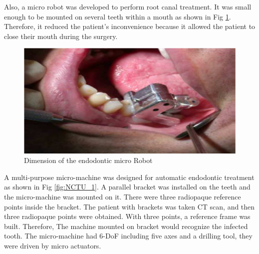 \par
Also, a micro robot was developed to perform root canal treatment. It was small enough to be mounted on several teeth within a mouth as shown in Fig \ref{fig:NCTU_4}. Therefore, it reduced the patient's inconvenience because it allowed the patient to close their mouth during the surgery.
\par
\begin{figure}[htbp]
\begin{center}
	\includegraphics[width=0.8\linewidth]{Images/NCTU_4.png}
	\caption[Dimension of the endodontic micro Robot]{Dimension of the endodontic micro Robot \cite{dong2006wip}}	
	\label{fig:NCTU_4}
\end{center}
\end{figure}
\par
A multi-purpose micro-machine was designed for automatic endodontic treatment as shown in Fig \ref{fig:NCTU_1}. A parallel bracket was installed on the teeth and the micro-machine was mounted on it. There were three radiopaque reference points inside the bracket. The patient with brackets was taken CT scan, and then three radiopaque points were obtained. With three points, a reference frame was built. Therefore, The machine mounted on bracket would recognize the infected tooth. The micro-machine had 6-DoF including five axes and a drilling tool, they were driven by micro actuators.

